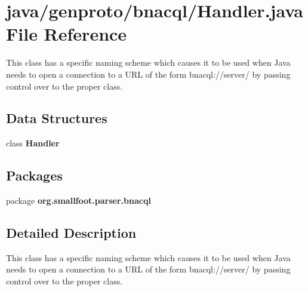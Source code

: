 \section{java/genproto/bnacql/\+Handler.java File Reference}
\label{bnacql_2Handler_8java}


This class has a specific naming scheme which causes it to be used when Java needs to open a connection to a U\+R\+L of the form bnacql\+://server/ by passing control over to the proper class.  


\subsection*{Data Structures}
\begin{DoxyCompactItemize}
\item 
class {\bf Handler}
\end{DoxyCompactItemize}
\subsection*{Packages}
\begin{DoxyCompactItemize}
\item 
package {\bf org.\+smallfoot.\+parser.\+bnacql}
\end{DoxyCompactItemize}


\subsection{Detailed Description}
This class has a specific naming scheme which causes it to be used when Java needs to open a connection to a U\+R\+L of the form bnacql\+://server/ by passing control over to the proper class. 

